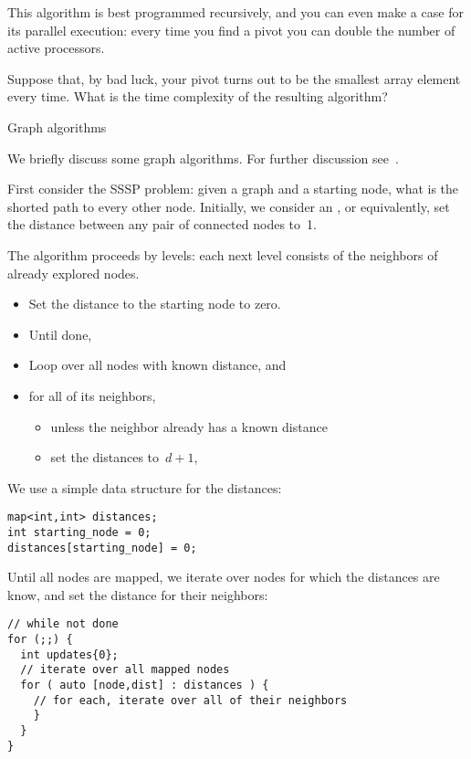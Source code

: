 This algorithm is best programmed recursively, and you can even make a
case for its parallel execution: every time you find a pivot you can
double the number of active processors.

\begin{exercise}
  Suppose that, by bad luck, your pivot turns out to be the smallest
  array element every time. What is the time complexity of the
  resulting algorithm?
\end{exercise}

 {Graph algorithms}

We briefly discuss some graph algorithms.
For further discussion see~.

First consider the \ac{SSSP} problem:
given a graph and a starting node,
what is the shorted path to every other node.
Initially, we consider an ,
or equivalently, set the distance between any pair of connected
nodes to~1.

The algorithm proceeds by levels: each next level consists of
the neighbors of already explored nodes.

\begin{itemize}
\item Set the distance to the starting node to zero.
\item Until done,
\item Loop over all nodes with known distance, and
\item for all of its neighbors,
  \begin{itemize}
  \item unless the neighbor already has a known distance
  \item set the distances to~$d+1$,
  \end{itemize}
\end{itemize}

We use a simple data structure for the distances:
\begin{lstlisting}
map<int,int> distances;  
int starting_node = 0;
distances[starting_node] = 0;
\end{lstlisting}

Until all nodes are mapped,
we iterate over nodes for which the distances are know, 
and set the distance for their neighbors:

\begin{lstlisting}
// while not done
for (;;) {
  int updates{0};
  // iterate over all mapped nodes
  for ( auto [node,dist] : distances ) {
    // for each, iterate over all of their neighbors
    }
  }
}  
\end{lstlisting}

